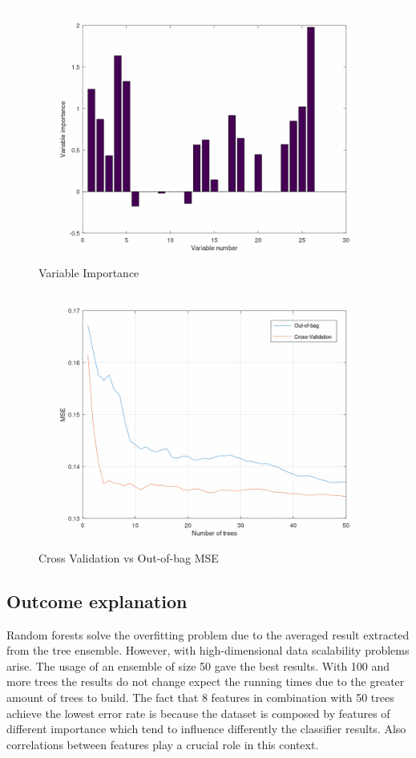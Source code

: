 \documentclass{article}
\begin{document}
\begin{figure}[H]
	\includegraphics[width=\textwidth,height=\textheight,keepaspectratio]{var_importance.png}
	\caption{Variable Importance}
	\label{fig:Var-Importance}
\end{figure}

\begin{figure}[H]
	\includegraphics[width=\textwidth,height=\textheight,keepaspectratio]{bag_vs_cv.png}
	\caption{Cross Validation vs Out-of-bag MSE}
	\label{fig:CV}
\end{figure}
	
\subsection{Outcome explanation}
Random forests solve the overfitting problem due to the averaged result extracted from the tree ensemble. However, with high-dimensional data scalability problems arise.
The usage of an ensemble of size 50 gave the best results. With 100 and more trees the results do not change expect the running times due to the greater amount of trees to build. The fact that 8 features in combination with 50 trees achieve the lowest error rate is because the dataset is composed by features of different importance which tend to influence differently the classifier results. Also correlations between features play a crucial role in this context.
\end{document}
